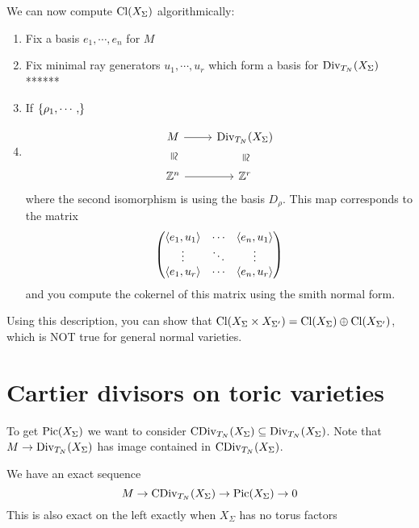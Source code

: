 We can now compute $\operatorname{Cl}(X_\Sigma)$ algorithmically:
\begin{enumerate}
\item Fix a basis $e_1,\cdots, e_n$ for $M$
\item Fix minimal ray generators $u_1,\cdots, u_r$ which form a basis for $\operatorname{Div}_{T_N}(X_\Sigma)$ ******
\item If $\left\{{\rho_1,\cdots,}\right\}$
\item %
\[\begin{tikzcd}
	M & {\Div_{T_N}(X_\Sigma)} \\
	{\Z^n} & {\Z^r}
	\arrow[from=1-1, to=1-2]
	\arrow["\cong"{marking, allow upside down}, draw=none, from=1-1, to=2-1]
	\arrow["\cong"{marking, allow upside down}, draw=none, from=1-2, to=2-2]
	\arrow[from=2-1, to=2-2]
\end{tikzcd}\]
where the second isomorphism is using the basis $D_{\rho}$. This map corresponds to the matrix
\[\begin{pmatrix}\left\langle {e_1,u_1}\right\rangle &\cdots &\left\langle {e_n,u_1}\right\rangle\\\vdots&\ddots&\vdots\\\left\langle {e_1,u_r}\right\rangle&\cdots&\left\langle {e_n,u_r}\right\rangle\end{pmatrix}\]
and you compute the cokernel of this matrix using the smith normal form.
\end{enumerate}



\begin{remark}
Using this description, you can show that $\operatorname{Cl}(X_\Sigma\times X_{\Sigma'})=\operatorname{Cl}(X_\Sigma)\oplus\operatorname{Cl}(X_{\Sigma'})$, which is NOT true for general normal varieties.
\end{remark}




\section{Cartier divisors on toric varieties}

To get $\operatorname{Pic}(X_\Sigma)$ we want to consider $\operatorname{CDiv}_{T_N}(X_\Sigma)\subseteq \operatorname{Div}_{T_N}(X_\Sigma)$. Note that $M\to \operatorname{Div}_{T_N}(X_\Sigma)$ has image contained in $\operatorname{CDiv}_{T_N}(X_\Sigma)$.


\begin{proposition}[]\label{PrExactSequenceOfTorusInvariantCartierDivisors}
We have an exact sequence
\[M\to \operatorname{CDiv}_{T_N}(X_\Sigma)\to \operatorname{Pic}(X_\Sigma)\to 0\]
This is also exact on the left exactly when $X_\Sigma$ has no torus factors
\end{proposition}


